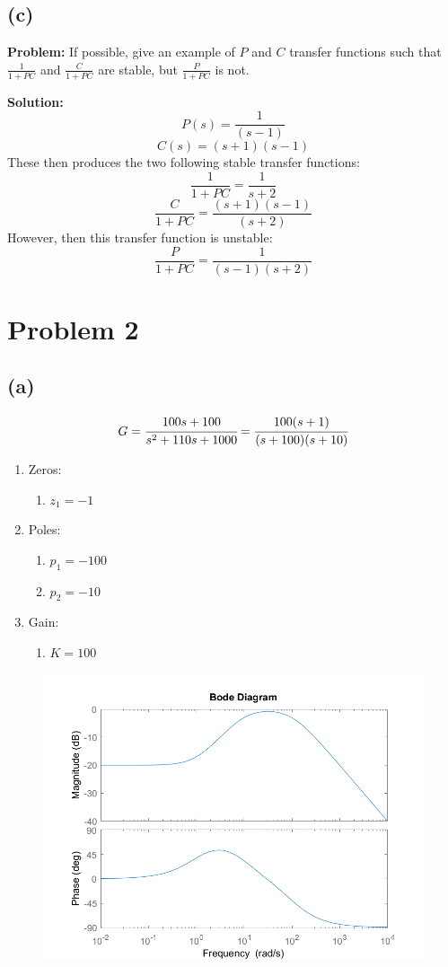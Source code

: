 \documentclass[letter]{article}
\numberwithin{equation}{section}
\begin{document}
\newpage
\subsection{(c)}
\textbf{Problem:} 
If possible, give an example of $P$ and $C$ transfer functions such that $\frac{1}{1+PC}$ and $\frac{C}{1+PC}$ are stable, but $\frac{P}{1+PC}$ is not.

\textbf{Solution:}
\[
	P(s) = \frac{1}{(s-1)}
\]\[
	C(s) = (s+1) (s-1)
\]
These then produces the two following stable transfer functions:
\[
	\frac{1}{1+PC} = \frac{1}{s+2}
\]\[
	\frac{C}{1+PC} = \frac{(s+1)(s-1)}{(s+2)}
\]
However, then this transfer function is unstable:
\[
	\frac{P}{1+PC} = \frac{1}{(s-1)(s+2)}
\]


\newpage
\section{Problem 2}
\subsection{(a)}
\[
	G = \cfrac{
		100 s + 100
	}{
		s^2 + 110s + 1000
	}
	= \cfrac{
		100 (s+1)
	}{
		(s+100) (s+10)
	}
\]
\begin{enumerate}
	\item Zeros:
	\begin{enumerate}
		\item $z_1 = -1$
	\end{enumerate}
	\item Poles:
	\begin{enumerate}
		\item $p_1 = -100$
		\item $p_2 = -10$
	\end{enumerate}
	\item Gain:
	\begin{enumerate}
		\item $K = 100$
	\end{enumerate}
\end{enumerate}

\begin{figure}[h!]
	\centering
	\includegraphics[width=\textwidth]{figs/pblm2a.png}
\end{figure}
\end{document}
